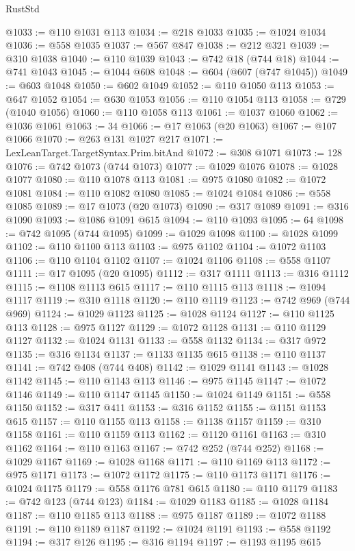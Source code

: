 \begin{lexlean}{RustStd}
\begin{coremodule}
@1033 := @110 @1031 @113
@1034 := @218 @1033
@1035 := @1024 @1034
@1036 := @558 @1035
@1037 := @567 @847
@1038 := @212 @321
@1039 := @310 @1038
@1040 := @110 @1039
@1043 := @742 @18 (@744 @18)
@1044 := @741 @1043
@1045 := @1044 @608
@1048 := @604 (@607 (@747 @1045))
@1049 := @603 @1048
@1050 := @602 @1049
@1052 := @110 @1050 @113
@1053 := @647 @1052
@1054 := @630 @1053
@1056 := @110 @1054 @113
@1058 := @729 (@1040 @1056)
@1060 := @110 @1058 @113
@1061 := @1037 @1060
@1062 := @1036 @1061
@1063 := 34
@1066 := @17 @1063 (@20 @1063)
@1067 := @107 @1066
@1070 := @263 @131 @1027 @217
@1071 := LexLeanTarget.TargetSyntax.Prim.bitAnd
@1072 := @308 @1071
@1073 := 128
@1076 := @742 @1073 (@744 @1073)
@1077 := @1029 @1076
@1078 := @1028 @1077
@1080 := @110 @1078 @113
@1081 := @975 @1080
@1082 := @1072 @1081
@1084 := @110 @1082 @1080
@1085 := @1024 @1084
@1086 := @558 @1085
@1089 := @17 @1073 (@20 @1073)
@1090 := @317 @1089
@1091 := @316 @1090
@1093 := @1086 @1091 @615
@1094 := @110 @1093
@1095 := 64
@1098 := @742 @1095 (@744 @1095)
@1099 := @1029 @1098
@1100 := @1028 @1099
@1102 := @110 @1100 @113
@1103 := @975 @1102
@1104 := @1072 @1103
@1106 := @110 @1104 @1102
@1107 := @1024 @1106
@1108 := @558 @1107
@1111 := @17 @1095 (@20 @1095)
@1112 := @317 @1111
@1113 := @316 @1112
@1115 := @1108 @1113 @615
@1117 := @110 @1115 @113
@1118 := @1094 @1117
@1119 := @310 @1118
@1120 := @110 @1119
@1123 := @742 @969 (@744 @969)
@1124 := @1029 @1123
@1125 := @1028 @1124
@1127 := @110 @1125 @113
@1128 := @975 @1127
@1129 := @1072 @1128
@1131 := @110 @1129 @1127
@1132 := @1024 @1131
@1133 := @558 @1132
@1134 := @317 @972
@1135 := @316 @1134
@1137 := @1133 @1135 @615
@1138 := @110 @1137
@1141 := @742 @408 (@744 @408)
@1142 := @1029 @1141
@1143 := @1028 @1142
@1145 := @110 @1143 @113
@1146 := @975 @1145
@1147 := @1072 @1146
@1149 := @110 @1147 @1145
@1150 := @1024 @1149
@1151 := @558 @1150
@1152 := @317 @411
@1153 := @316 @1152
@1155 := @1151 @1153 @615
@1157 := @110 @1155 @113
@1158 := @1138 @1157
@1159 := @310 @1158
@1161 := @110 @1159 @113
@1162 := @1120 @1161
@1163 := @310 @1162
@1164 := @110 @1163
@1167 := @742 @252 (@744 @252)
@1168 := @1029 @1167
@1169 := @1028 @1168
@1171 := @110 @1169 @113
@1172 := @975 @1171
@1173 := @1072 @1172
@1175 := @110 @1173 @1171
@1176 := @1024 @1175
@1179 := @558 @1176 @781 @615
@1180 := @110 @1179
@1183 := @742 @123 (@744 @123)
@1184 := @1029 @1183
@1185 := @1028 @1184
@1187 := @110 @1185 @113
@1188 := @975 @1187
@1189 := @1072 @1188
@1191 := @110 @1189 @1187
@1192 := @1024 @1191
@1193 := @558 @1192
@1194 := @317 @126
@1195 := @316 @1194
@1197 := @1193 @1195 @615

\end{coremodule}
\end{lexlean}
